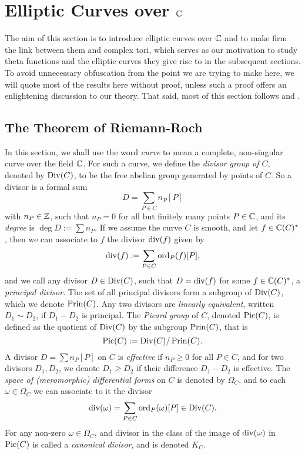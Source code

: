 \section{Elliptic Curves over $\mathbb{C}$}

The aim of this section is to introduce elliptic curves over $\mathbb{C}$ and to make firm the link between them and complex tori, which serves as our motivation to study theta functions and the elliptic curves they give rise to in the subsequent sections. To avoid unnecessary obfuscation from the point we are trying to make here, we will quote most of the results here without proof, unless such a proof offers an enlightening discussion to our theory. That said, most of this section follows \cite{Silverman_2009} and \cite{Hart_1977}.

\subsection{The Theorem of Riemann-Roch}

In this section, we shall use the word \emph{curve} to mean a complete, non-singular curve over the field $\mathbb{C}$. For such a curve, we define the \emph{divisor group of $C$}, denoted by $\operatorname{Div}(C)$, to be the free abelian group generated by points of $C$. So a divisor is a formal sum
\begin{equation*}
	D = \sum_{P\in C} n_{P}[P]
\end{equation*}
with $n_{P} \in \mathbb{Z}$, such that $n_{P} = 0$ for all but finitely many points $P \in \mathbb{C}$, and its \emph{degree} is $\deg D := \sum n_{P}$. If we assume the curve $C$ is smooth, and let $f \in \mathbb{C}(C)^{\ast}$, then we can associate to $f$ the divisor $\operatorname{div}(f)$ given by
\begin{equation*}
	\operatorname{div}(f) := \sum_{P\in C}\operatorname{ord}_{P}(f)[P],
\end{equation*}
and we call any divisor $D \in \operatorname{Div}(C)$, such that $D = \operatorname{div}(f)$ for some $f \in \mathbb{C}(C)^{\ast}$, a \emph{principal divisor}. The set of all principal divisors form a subgroup of $\operatorname{Div}(C)$, which we denote $\operatorname{Prin}(C)$. Any two divisors are \emph{linearly equivalent}, written $D_{1} \sim D_{2}$, if $D_{1} - D_{2}$ is principal. The \emph{Picard group} of $C$, denoted $\operatorname{Pic}(C)$, is defined as the quotient of $\operatorname{Div}(C)$ by the subgroup $\operatorname{Prin}(C)$, that is
	\begin{equation*}
		\operatorname{Pic}(C) := \operatorname{Div}(C)/\operatorname{Prin}(C).
	\end{equation*}
A divisor $D = \sum n_{P}[P]$ on $C$ is \emph{effective} if $n_{P} \geq 0$ for all $P \in C$, and for two divisors $D_{1}, D_{2}$, we denote $D_{1} \geq D_{2}$ if their difference $D_{1} - D_{2}$ is effective. The \emph{space of (meromorphic) differential forms} on $C$ is denoted by $\Omega_{C}$, and to each $\omega \in \Omega_{C}$ we can associate to it the divisor
\begin{equation*}
	\operatorname{div}(\omega) = \sum_{P\in C}\operatorname{ord}_{P}(\omega)[P] \in \operatorname{Div}(C).
\end{equation*}
For any non-zero $\omega \in \Omega_{C}$, and divisor in the class of the image of $\operatorname{div}(\omega)$ in $\operatorname{Pic}(C)$ is called a \emph{canonical divisor}, and is denoted $K_{C}$.\\

